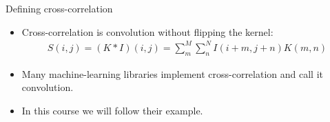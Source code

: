 \documentclass{beamer}
\begin{document}
    \begin{frame}{Defining cross-correlation}
        \begin{itemize}
					\item Cross-correlation is convolution without flipping the kernel: %
        \begin{align}
            S(i,j) = (K*I)(i,j) = \sum_m^M \sum_n^N I(i+m, j+n)K(m,n)
        \end{align}
        \item Many machine-learning libraries implement cross-correlation and
        call it convolution. 
				\item In this course we will follow their example.
				\end{itemize}
    \end{frame}
\end{document}
